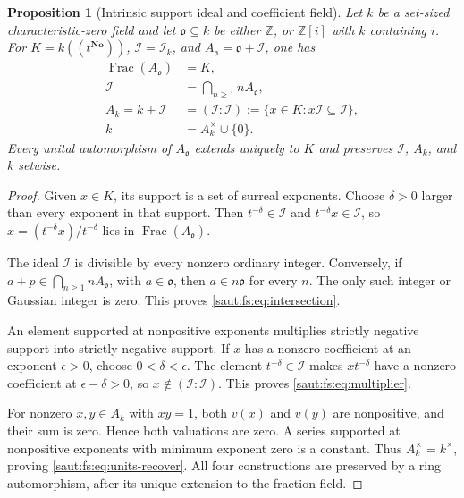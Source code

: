 \documentclass[11pt]{article}
\newtheorem{proposition}[theorem]{Proposition}
\theoremstyle{definition}
\theoremstyle{remark}
\newcommand{\No}{\mathbf{No}}
\newcommand{\Z}{\mathbb Z}
\newcommand{\Frac}{\operatorname{Frac}}
\newcommand{\Ineg}{\mathcal I}
\numberwithin{equation}{section}
\begin{document}
\begin{proposition}[Intrinsic support ideal and coefficient field]\label{saut:fs:prop:reconstruction}
Let $k$ be a set-sized characteristic-zero field and let $\mathfrak o\subseteq k$ be
either $\Z$, or $\Z[i]$ with $k$ containing $i$. For $K=k((t^{\No}))$,
$\Ineg=\Ineg_k$, and $A_{\mathfrak o}=\mathfrak o+\Ineg$, one has
\begin{align}
 \Frac(A_{\mathfrak o})&=K,\label{saut:fs:eq:frac}\\
 \Ineg&=\bigcap_{n\ge1}nA_{\mathfrak o},\label{saut:fs:eq:intersection}\\
 A_k=k+\Ineg&=(\Ineg:\Ineg):=\{x\in K:x\Ineg\subseteq\Ineg\},\label{saut:fs:eq:multiplier}\\
 k&=A_k^\times\cup\{0\}.\label{saut:fs:eq:units-recover}
\end{align}
Every unital automorphism of $A_{\mathfrak o}$ extends uniquely to $K$ and preserves
$\Ineg$, $A_k$, and $k$ setwise.
\end{proposition}
\begin{proof}
Given $x\in K$, its support is a set of surreal exponents. Choose $\delta>0$ larger
than every exponent in that support. Then $t^{-\delta}\in\Ineg$ and
$t^{-\delta}x\in\Ineg$, so $x=(t^{-\delta}x)/t^{-\delta}$ lies in
$\Frac(A_{\mathfrak o})$.

The ideal $\Ineg$ is divisible by every nonzero ordinary integer. Conversely, if
$a+p\in\bigcap_{n\ge1}nA_{\mathfrak o}$, with $a\in\mathfrak o$, then $a\in n\mathfrak o$
for every $n$. The only such integer or Gaussian integer is zero. This proves
\eqref{saut:fs:eq:intersection}.

An element supported at nonpositive exponents multiplies strictly negative support
into strictly negative support. If $x$ has a nonzero coefficient at an exponent
$\epsilon>0$, choose $0<\delta<\epsilon$. The element $t^{-\delta}\in\Ineg$ makes
$xt^{-\delta}$ have a nonzero coefficient at $\epsilon-\delta>0$, so
$x\notin(\Ineg:\Ineg)$. This proves \eqref{saut:fs:eq:multiplier}.

For nonzero $x,y\in A_k$ with $xy=1$, both $v(x)$ and $v(y)$ are nonpositive, and
their sum is zero. Hence both valuations are zero. A series supported at nonpositive
exponents with minimum exponent zero is a constant. Thus $A_k^\times=k^\times$,
proving \eqref{saut:fs:eq:units-recover}. All four constructions are preserved by a
ring automorphism, after its unique extension to the fraction field.
\end{proof}
\end{document}
